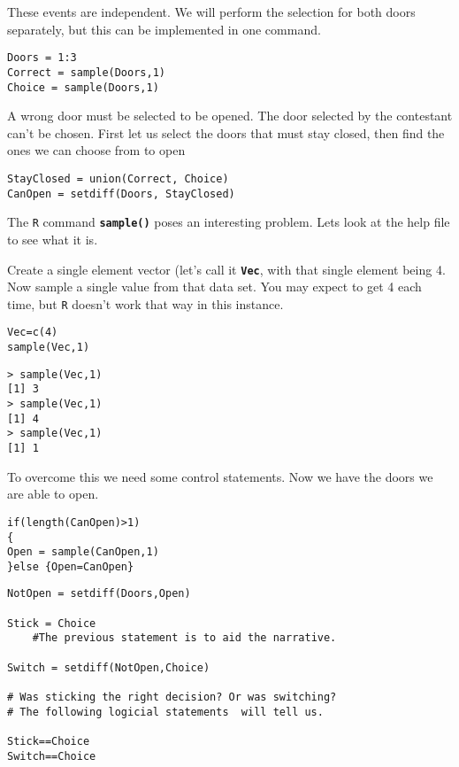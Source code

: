 These events are independent. We will perform the selection for both doors separately, but this can be implemented in one command.


\begin{framed}
\begin{verbatim}
Doors = 1:3
Correct = sample(Doors,1)
Choice = sample(Doors,1)
\end{verbatim}
\end{framed}

A wrong door must be selected to be opened. The door selected by the contestant can't be chosen. First let us select the doors that must stay closed, then find the ones we can choose from to open

\begin{framed}
\begin{verbatim}
StayClosed = union(Correct, Choice)
CanOpen = setdiff(Doors, StayClosed)
\end{verbatim}
\end{framed}

The \texttt{R} command \texttt{\textbf{sample()}} poses an interesting problem. Lets look at the help file to see what it is.

Create a single element vector (let's call it \texttt{\textbf{Vec}}, with that single element being 4. Now sample a single value from that data set. You may expect to get 4 each time, but \texttt{R} doesn’t work that way in this instance.

\begin{framed}
\begin{verbatim}
Vec=c(4)
sample(Vec,1)
\end{verbatim}
\end{framed}

\begin{verbatim}
> sample(Vec,1)
[1] 3
> sample(Vec,1)
[1] 4
> sample(Vec,1)
[1] 1
\end{verbatim}
To overcome this we need some control statements. Now we have the doors we are able to open.

\begin{framed}
\begin{verbatim}
if(length(CanOpen)>1)
{
Open = sample(CanOpen,1)
}else {Open=CanOpen}
\end{verbatim}
\end{framed}


\begin{framed}
\begin{verbatim}
NotOpen = setdiff(Doors,Open)

Stick = Choice
    #The previous statement is to aid the narrative.

Switch = setdiff(NotOpen,Choice)

# Was sticking the right decision? Or was switching?
# The following logicial statements  will tell us.

Stick==Choice
Switch==Choice
\end{verbatim}
\end{framed}


